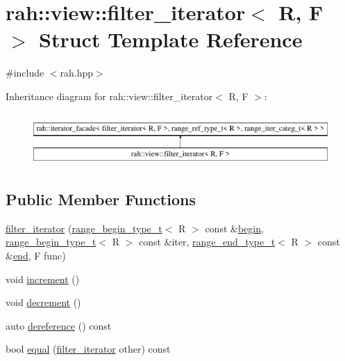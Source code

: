 \hypertarget{structrah_1_1view_1_1filter__iterator}{}\section{rah\+::view\+::filter\+\_\+iterator$<$ R, F $>$ Struct Template Reference}
\label{structrah_1_1view_1_1filter__iterator}


{\ttfamily \#include $<$rah.\+hpp$>$}

Inheritance diagram for rah\+::view\+::filter\+\_\+iterator$<$ R, F $>$\+:\begin{figure}[H]
\begin{center}
\leavevmode
\includegraphics[height=1.996435cm]{structrah_1_1view_1_1filter__iterator}
\end{center}
\end{figure}
\subsection*{Public Member Functions}
\begin{DoxyCompactItemize}
\item 
\mbox{\hyperlink{structrah_1_1view_1_1filter__iterator_a31543c024a816c4f3e8fc8937b2a9214}{filter\+\_\+iterator}} (\mbox{\hyperlink{namespacerah_afa7f59d1f37c7b9d9caed37551be9eaa}{range\+\_\+begin\+\_\+type\+\_\+t}}$<$ R $>$ const \&\mbox{\hyperlink{namespacerah_a2c4a19e57cc4e0753e93830f247def6d}{begin}}, \mbox{\hyperlink{namespacerah_afa7f59d1f37c7b9d9caed37551be9eaa}{range\+\_\+begin\+\_\+type\+\_\+t}}$<$ R $>$ const \&iter, \mbox{\hyperlink{namespacerah_a3042a09fc211e86eea6771d01375d263}{range\+\_\+end\+\_\+type\+\_\+t}}$<$ R $>$ const \&\mbox{\hyperlink{namespacerah_aaddd1442cd76b96876e692cdefe7261d}{end}}, F func)
\item 
void \mbox{\hyperlink{structrah_1_1view_1_1filter__iterator_a63278a452be5e546e6fb3aa0b1a90bfb}{increment}} ()
\item 
void \mbox{\hyperlink{structrah_1_1view_1_1filter__iterator_aed445498ffbec0c3e782ddc17314b677}{decrement}} ()
\item 
auto \mbox{\hyperlink{structrah_1_1view_1_1filter__iterator_a04ce8bb8bb607b986e692f8e39bed6e3}{dereference}} () const
\item 
bool \mbox{\hyperlink{structrah_1_1view_1_1filter__iterator_a4ab0c322842146d3011ae7c88deb82f7}{equal}} (\mbox{\hyperlink{structrah_1_1view_1_1filter__iterator}{filter\+\_\+iterator}} other) const
\end{DoxyCompactItemize}
